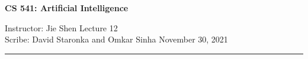 \documentclass[12pt]{article}
\begin{document}


\begin{center}
\bf\large CS 541: Artificial Intelligence
\end{center}

\noindent
Instructor: Jie Shen
\hfill
Lecture 12               %
\\
Scribe:   David Staronka and Omkar Sinha              %
\hfill
November 30, 2021                         %

\noindent
\rule{\textwidth}{1pt}

\medskip

\end{document}
